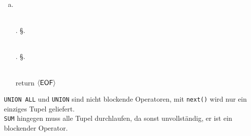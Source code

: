\documentclass{uni_tue_template}
\newcommand{\code}[1]{\texttt{{\footnotesize #1}}}
\newcommand{\tn}[1]{\textup{\textsf{#1}}}
\begin{document}
\begin{enumerate}[(a)]
\begin{function}[H]
		\end{function}
		\newpage
		\item \hfill\\
		\begin{function}[H]
		\Function{\FFunction{}}\\
		\R.\FFunction{}\;
		\S.\FFunction{}\;
		\end{function}
		\begin{function}[H]
		\Function{\FFunction{}}\\
		\R.\FFunction{}\;
		\S.\FFunction{}\;
		\end{function}
		\begin{function}[H]
		\Function{\FFunction{}}\\
		\While{$($\r $\leftarrow$ \R.\FFunction{}$)$ $\neq$ $\langle \tn{EOF} \rangle$}{\sum $\leftarrow$ \sum + \r}
		\While{$($\s $\leftarrow$ \S.\FFunction{}$)$ $\neq$ $\langle \tn{EOF} \rangle$}{\sum $\leftarrow$ \sum + \s}
		return $\langle \tn{EOF} \rangle$\;
		\end{function}
	\end{enumerate}
	\item \code{UNION ALL} und \code{UNION} sind nicht blockende Operatoren, mit \code{next()} wird nur ein einziges Tupel geliefert.\\
	\code{SUM} hingegen muss alle Tupel durchlaufen, da sonst unvollständig, er ist ein blockender Operator.
\subExEnd{}
\end{document}
